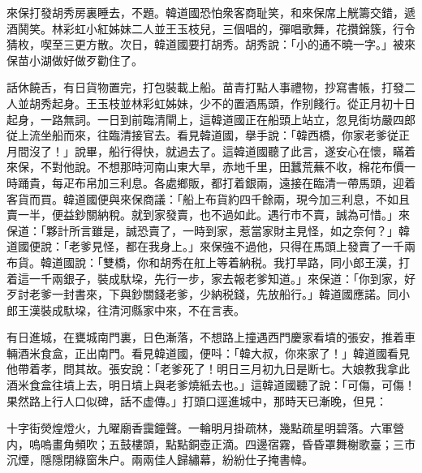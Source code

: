 來保打發胡秀房裏睡去，不題。韓道國恐怕衆客商耻笑，和來保席上觥籌交錯，遞酒鬨笑。林彩虹小紅姊妹二人並王玉枝兒，三個唱的，彈唱歌舞，花攢錦簇，行令猜枚，喫至三更方散。次日，韓道國要打胡秀。胡秀說：「小的通不曉一字。」被來保苗小湖做好做歹勸住了。

話休饒舌，有日貨物置完，打包裝載上船。苗青打點人事禮物，抄寫書帳，打發二人並胡秀起身。王玉枝並林彩虹姊妹，少不的置酒馬頭，作别餞行。從正月初十日起身，一路無詞。一日到前臨清閘上，這韓道國正在船頭上站立，忽見街坊嚴四郎従上流坐船而來，往臨清接官去。看見韓道國，擧手說：「韓西橋，你家老爹従正月間沒了！」說畢，船行得快，就過去了。這韓道國聽了此言，遂安心在懷，瞞着來保，不對他說。不想那時河南山東大旱，赤地千里，田蠶荒蕪不收，棉花布價一時踊貴，每疋布帛加三利息。各處鄉販，都打着銀兩，遠接在臨清一帶馬頭，迎着客貨而買。韓道國便與來保商議：「船上布貨約四千餘兩，現今加三利息，不如且賣一半，便益鈔關納稅。就到家發賣，也不過如此。遇行市不賣，誠為可惜。」來保道：「夥計所言雖是，誠恐賣了，一時到家，惹當家財主見怪，如之奈何？」韓道國便說：「老爹見怪，都在我身上。」來保強不過他，只得在馬頭上發賣了一千兩布貨。韓道國說：「雙橋，你和胡秀在舡上等着納税。我打旱路，同小郎王漢，打着這一千兩銀子，裝成馱垜，先行一步，家去報老爹知道。」來保道：「你到家，好歹討老爹一封書來，下與鈔關錢老爹，少納税錢，先放船行。」韓道國應諾。同小郎王漢裝成馱垜，往清河縣家中來，不在言表。

有日進城，在甕城南門裏，日色漸落，不想路上撞遇西門慶家看墳的張安，推着車輛酒米食盒，正出南門。看見韓道國，便呌：「韓大叔，你來家了！」韓道國看見他帶着孝，問其故。張安說：「老爹死了！明日三月初九日是断七。大娘教我拿此酒米食盒往墳上去，明日墳上與老爹燒紙去也。」這韓道國聽了說：「可傷，可傷！果然路上行人口似碑，話不虚傳。」打頭口逕進城中，那時天已漸晚，但見：

\begin{myquote}
十字街熒煌燈火，九曜廟香靄鐘聲。一輪明月掛疏林，幾點疏星明碧落。六軍營内，嗚嗚畫角頻吹；五鼓樓頭，點點銅壺正滴。四邊宿霧，昏昏罩舞榭歌臺；三市沉煙，隱隱閉綠窗朱户。兩兩佳人歸繡幕，紛紛仕子掩書幃。　
\end{myquote}

